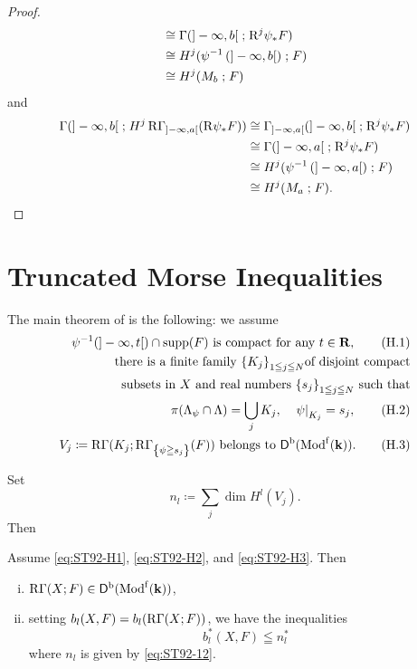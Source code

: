 \begin{proof}
\begin{align*}
    &\cong
    \Gamma({]-\infty,b[}\mathrel{;}\Rder^{j}{\psi}_{\ast}F)\\
    &\cong
    H^{j}({\psi}^{-1}\left({]-\infty,b[}\right)\mathrel{;}F)\\
    &\cong
    H^{j}(M_{b}\mathrel{;}F)
  \end{align*}
  and
  \begin{align*}
    \Gamma({]-\infty,b[}\mathrel{;}H^{j}\RG_{]-\infty,a[}(\Rder{\psi}_{\ast}F))
    &\cong
    \Gamma_{]-\infty,a[}({]-\infty,b[}\mathrel{;}\Rder^{j}{\psi}_{\ast}F)\\
    &\cong
    \Gamma({]-\infty,a[}\mathrel{;}\Rder^{j}{\psi}_{\ast}F)\\
    &\cong
    H^{j}({\psi}^{-1}\left({]-\infty,a[}\right)\mathrel{;}F)\\
    &\cong
    H^{j}(M_{a}\mathrel{;}F).
  \end{align*}
\end{proof}

\section{Truncated Morse Inequalities}
The main theorem of \cite{ST92} is the following: 
we assume
\begin{align}\label{eq:ST92-H1}
  \text{\(\psi^{-1}(]-\infty,t[)\cap \supp(F)\) is compact for any \(t\in\rr\)}, \tag{H.1}\\
  \text{there is a finite family \(\left\{K_{j}\right\}_{1\leqq j\leqq N}\)of disjoint compact}\notag\\
  \text{subsets in \(X\) and real numbers \(\left\{s_{j}\right\}_{1\leqq j\leqq N}\) such that}\notag\\
  \pi(\Lambda_{\psi}\cap \Lambda)=\bigcup_{j}K_{j},
  \quad
  \mres[\psi]{K_{j}}=s_j,\tag{H.2}\label{eq:ST92-H2}\\
  \text{\(V_{j}\coloneqq
  \RG(K_{j};\RG_{\left\{\psi\geqq s_{j}\right\}}(F))\) belongs to \(\Dompb(\Modf(\kk))\).}\tag{H.3}\label{eq:ST92-H3}
\end{align}

Set 
\begin{equation}
  n_{l}\coloneqq \sum_{j}\dim H^{l}(V_j).  \label{eq:ST92-12}
\end{equation}
Then 
\begin{Theorem+}
  Assume \eqref{eq:ST92-H1}, \eqref{eq:ST92-H2}, and \eqref{eq:ST92-H3}. 
  Then
  \begin{enumerate}[(i)]
    \item \(\RG(X;F)\in\Dompb(\Modf(\kk))\),
    \item setting \(b_{l}(X,F)= b_{l}(\RG(X;F))\), we have the inequalities\[
      b_{l}^{\ast}(X,F)\leqq n_{l}^{\ast}
    \] where \(n_{l}\) is given by \eqref{eq:ST92-12}.
  \end{enumerate}
\end{Theorem+}

